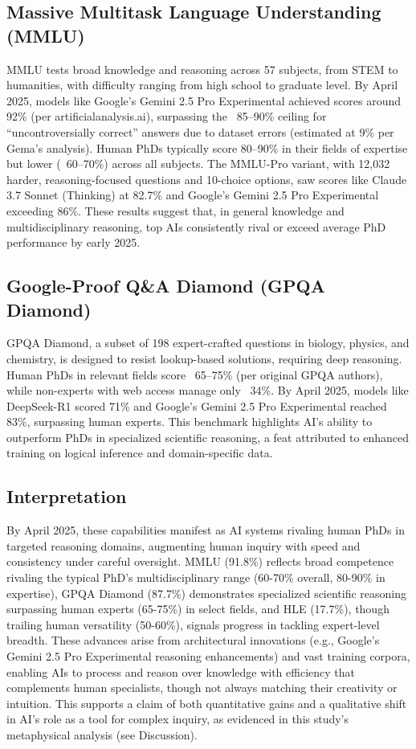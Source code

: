 \documentclass[11pt]{article}
\begin{document}
\subsection{Massive Multitask Language Understanding (MMLU)}
MMLU tests broad knowledge and reasoning across 57 subjects, from STEM to humanities, with difficulty ranging from high school to graduate level. By April 2025, models like Google’s Gemini 2.5 Pro Experimental achieved scores around 92\% (per artificialanalysis.ai), surpassing the ~85–90\% ceiling for “uncontroversially correct” answers due to dataset errors (estimated at 9\% per Gema’s analysis). Human PhDs typically score 80–90\% in their fields of expertise but lower (~60–70\%) across all subjects. The MMLU-Pro variant, with 12,032 harder, reasoning-focused questions and 10-choice options, saw scores like Claude 3.7 Sonnet (Thinking) at 82.7\% and Google’s Gemini 2.5 Pro Experimental exceeding 86\%. These results suggest that, in general knowledge and multidisciplinary reasoning, top AIs consistently rival or exceed average PhD performance by early 2025.

\subsection{Google-Proof Q\&A Diamond (GPQA Diamond)}
GPQA Diamond, a subset of 198 expert-crafted questions in biology, physics, and chemistry, is designed to resist lookup-based solutions, requiring deep reasoning. Human PhDs in relevant fields score ~65–75\% (per original GPQA authors), while non-experts with web access manage only ~34\%. By April 2025, models like DeepSeek-R1 scored 71\% and Google’s Gemini 2.5 Pro Experimental reached 83\%, surpassing human experts. This benchmark highlights AI’s ability to outperform PhDs in specialized scientific reasoning, a feat attributed to enhanced training on logical inference and domain-specific data.

\subsection{Interpretation}
By April 2025, these capabilities manifest as AI systems rivaling human PhDs in targeted reasoning domains, augmenting human inquiry with speed and consistency under careful oversight. MMLU (91.8\%) reflects broad competence rivaling the typical PhD’s multidisciplinary range (60-70\% overall, 80-90\% in expertise), GPQA Diamond (87.7\%) demonstrates specialized scientific reasoning surpassing human experts (65-75\%) in select fields, and HLE (17.7\%), though trailing human versatility (50-60\%), signals progress in tackling expert-level breadth. These advances arise from architectural innovations (e.g., Google’s Gemini 2.5 Pro Experimental reasoning enhancements) and vast training corpora, enabling AIs to process and reason over knowledge with efficiency that complements human specialists, though not always matching their creativity or intuition. This supports a claim of both quantitative gains and a qualitative shift in AI’s role as a tool for complex inquiry, as evidenced in this study’s metaphysical analysis (see Discussion).
\end{document}
